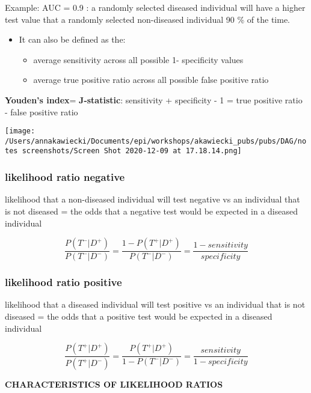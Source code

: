 \documentclass[
]{article}
\providecommand{\tightlist}{%
  \setlength{\itemsep}{0pt}\setlength{\parskip}{0pt}}
\begin{document}
Example: AUC = 0.9 : a randomly selected diseased individual will have a
higher test value that a randomly selected non-diseased individual 90 \%
of the time.

\begin{itemize}
\tightlist
\item
  It can also be defined as the:

  \begin{itemize}
  \tightlist
  \item
    average sensitivity across all possible 1- specificity values
  \item
    average true positive ratio across all possible false positive ratio
  \end{itemize}
\end{itemize}

\textbf{Youden's index}= \textbf{J-statistic}: sensitivity + specificity
- 1 = true positive ratio - false positive ratio

\texttt{[image: /Users/annakawiecki/Documents/epi/workshops/akawiecki\_pubs/pubs/DAG/notes screenshots/Screen Shot 2020-12-09 at 17.18.14.png]}

\hypertarget{likelihood-ratio-negative}{%
\subsubsection{likelihood ratio
negative}\label{likelihood-ratio-negative}}

likelihood that a non-diseased individual will test negative vs an
individual that is not diseased = the odds that a negative test would be
expected in a diseased individual

\[\frac{P(T^-|D^+)}{P(T^-|D^-)}= \frac{1-P(T^+ | D^+)}{P(T^- | D^-)}= \frac{1-sensitivity}{specificity}\]

\hypertarget{likelihood-ratio-positive}{%
\subsubsection{likelihood ratio
positive}\label{likelihood-ratio-positive}}

likelihood that a diseased individual will test positive vs an
individual that is not diseased = the odds that a positive test would be
expected in a diseased individual

\[\frac{P(T^+|D^+)}{P(T^+|D^-)}= \frac{P(T^+ | D^+)}{1-P(T^- | D^-)}= \frac{sensitivity}{1-specificity}\]

\textbf{CHARACTERISTICS OF LIKELIHOOD RATIOS}
\end{document}
